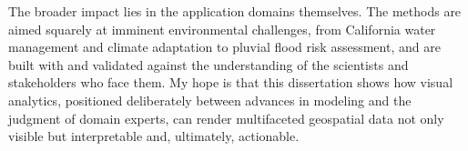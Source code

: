 The broader impact lies in the application domains themselves. The methods are aimed squarely at imminent environmental challenges, from California water management and climate adaptation to pluvial flood risk assessment, and are built with and validated against the understanding of the scientists and stakeholders who face them. My hope is that this dissertation shows how visual analytics, positioned deliberately between advances in modeling and the judgment of domain experts, can render multifaceted geospatial data not only visible but interpretable and, ultimately, actionable.

